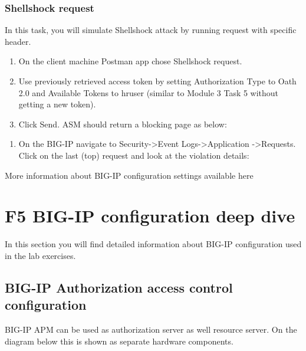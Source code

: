 \documentclass[letterpaper,10pt,english]{sphinxmanual}
\begin{document}
\subsection{Shellshock request}
\label{\detokenize{class1/module4/module4:shellshock-request}}
In this task, you will simulate Shellshock attack by running request
with specific header.
\begin{enumerate}
\item {} 
On the client machine Postman app chose Shellshock request.

\item {} 
Use previously retrieved access token by setting Authorization Type
to Oath 2.0 and Available Tokens to hruser (similar to Module 3 Task
5 without getting a new token).

\item {} 
Click Send. ASM should return a blocking page as below:

\end{enumerate}
\begin{quote}

\noindent{}
\end{quote}
\begin{enumerate}
\item {} 
On the BIG-IP navigate to Security-\textgreater{}Event Logs-\textgreater{}Application
-\textgreater{}Requests. Click on the last (top) request and look at the violation
details:

\end{enumerate}
\begin{quote}

\noindent{}
\end{quote}

More information about BIG-IP configuration settings available here {\hyperref[\detokenize{class2/class2:f5-big-ip-configuration-deep-dive}]{}}


\chapter{F5 BIG-IP configuration deep dive}
\label{\detokenize{class2/class2:f5-big-ip-configuration-deep-dive}}\label{\detokenize{class2/class2::doc}}
In this section you will find detailed information about BIG-IP configuration used in the lab exercises.


\section{BIG-IP Authorization access control configuration}
\label{\detokenize{class2/module1/module1::doc}}\label{\detokenize{class2/module1/module1:big-ip-authorization-access-control-configuration}}
BIG-IP APM can be used as authorization server as well resource server. On the diagram below this is shown as separate hardware components.
\begin{quote}

\noindent{}
\end{quote}
\end{document}
